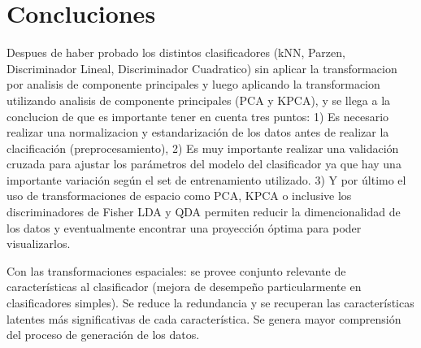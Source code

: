 \documentclass[fleqn,10pt]{SelfArx}
\begin{document}
\section*{Concluciones}

Despues de haber probado los distintos clasificadores (kNN, Parzen, Discriminador Lineal, Discriminador Cuadratico) sin aplicar la transformacion por analisis de componente principales y luego aplicando la transformacion utilizando analisis de componente principales (PCA y KPCA), y se llega a la conclucion de que es importante tener en cuenta tres puntos: 1) Es necesario realizar una normalizacion y estandarización de los datos antes de realizar la clacificación (pre\-procesamiento), 2) Es muy importante realizar una validación cruzada para ajustar los parámetros del modelo del  clasificador ya que hay una importante variación según el set de entrenamiento utilizado. 3) Y por último el uso de transformaciones de espacio como PCA, KPCA o inclusive los discriminadores de Fisher LDA y QDA permiten reducir la dimencionalidad de los datos y eventualmente encontrar una proyección óptima para poder visualizarlos.

Con las transformaciones espaciales: se provee conjunto relevante de características al clasificador (mejora de desempeño particularmente en clasificadores simples). Se reduce la redundancia y se recuperan las características latentes más significativas de cada característica. Se genera mayor comprensión del proceso de generación de los datos.
\end{document}
